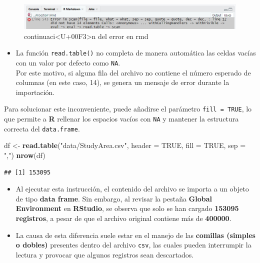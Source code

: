 \documentclass[
]{book}
\newenvironment{Shaded}{\begin{snugshade}}{\end{snugshade}}
\newcommand{\AttributeTok}[1]{\textcolor[rgb]{0.13,0.29,0.53}{#1}}
\newcommand{\ConstantTok}[1]{\textcolor[rgb]{0.56,0.35,0.01}{#1}}
\newcommand{\FunctionTok}[1]{\textcolor[rgb]{0.13,0.29,0.53}{\textbf{#1}}}
\newcommand{\NormalTok}[1]{#1}
\newcommand{\OtherTok}[1]{\textcolor[rgb]{0.56,0.35,0.01}{#1}}
\newcommand{\StringTok}[1]{\textcolor[rgb]{0.31,0.60,0.02}{#1}}
\providecommand{\tightlist}{%
  \setlength{\itemsep}{0pt}\setlength{\parskip}{0pt}}
\begin{document}
\begin{figure}

{\centering \includegraphics[width=0.75\linewidth]{images/error2} 

}

\caption{continuaci<U+00F3>n del error en rmd}\label{fig:fig-4}
\end{figure}

\begin{itemize}
\tightlist
\item
  La función \texttt{read.table()} no completa de manera automática las celdas vacías con un valor por defecto como \texttt{NA}.\\
  Por este motivo, si alguna fila del archivo no contiene el número esperado de columnas (en este caso, 14), se genera un mensaje de error durante la importación.
\end{itemize}

Para solucionar este inconveniente, puede añadirse el parámetro \texttt{fill\ =\ TRUE}, lo que permite a \textbf{R} rellenar los espacios vacíos con \texttt{NA} y mantener la estructura correcta del \texttt{data.frame}.

\begin{Shaded}
\begin{Highlighting}[]
\NormalTok{df }\OtherTok{\textless{}{-}} \FunctionTok{read.table}\NormalTok{(}\StringTok{"data/StudyArea.csv"}\NormalTok{, }
                 \AttributeTok{header =} \ConstantTok{TRUE}\NormalTok{, }
                 \AttributeTok{fill   =} \ConstantTok{TRUE}\NormalTok{, }
                 \AttributeTok{sep    =} \StringTok{","}\NormalTok{)}
\FunctionTok{nrow}\NormalTok{(df)}
\end{Highlighting}
\end{Shaded}

\begin{verbatim}
## [1] 153095
\end{verbatim}

\begin{itemize}
\item
  Al ejecutar esta instrucción, el contenido del archivo se importa a un objeto de tipo \textbf{data frame}. Sin embargo, al revisar la pestaña \textbf{Global Environment} en \textbf{RStudio}, se observa que solo se han cargado \textbf{153095 registros}, a pesar de que el archivo original contiene más de \textbf{400000}.
\item
  La causa de esta diferencia suele estar en el manejo de las \textbf{comillas (simples o dobles)} presentes dentro del archivo \texttt{csv}, las cuales pueden interrumpir la lectura y provocar que algunos registros sean descartados.
\end{itemize}
\end{document}
